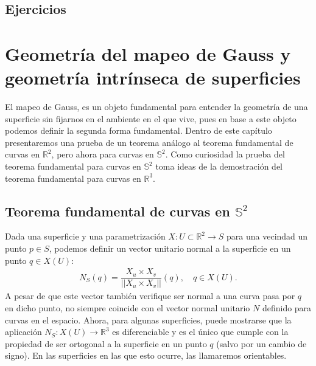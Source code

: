 \documentclass[oneside,11pt]{memoir}
\begin{document}
\section{Ejercicios}
\chapter{Geometría del mapeo de Gauss y geometría intrínseca de superficies}
El mapeo de Gauss, es un objeto fundamental para entender la geometría de una superficie sin fijarnos en el ambiente en el que vive, pues en base a este objeto podemos definir la segunda forma fundamental. Dentro de este capítulo presentaremos una prueba de un teorema análogo al teorema fundamental de curvas en $\mathbb{R}^2$, pero ahora para curvas en $\mathbb{S}^2$. Como curiosidad la prueba del teorema fundamental para curvas en $\mathbb{S}^2$ toma ideas de la demostración del teorema fundamental para curvas en $\mathbb{R}^3$.
\section{Teorema fundamental de curvas en $\mathbb{S}^2$}
Dada una superficie y una parametrización $X:U\subset\mathbb{R}^2\to S$ para una vecindad un punto $p\in S$, podemos definir un vector unitario normal a la superficie en un punto $q\in X(U)$:
\begin{align*}
    N_S(q)=\dfrac{X_u\times X_v}{||X_u\times X_v||}(q), \quad q\in X(U).
\end{align*}
A pesar de que este vector también verifique ser normal a una curva pasa por $q$ en dicho punto, no siempre coincide con el vector normal unitario $N$ definido para curvas en el espacio. Ahora, para algunas superficies, puede mostrarse que la aplicación $N_S:X(U)\to \mathbb{R}^3$ es diferenciable y es el único que cumple con la propiedad de ser ortogonal a la superficie en un punto $q$ (salvo por un cambio de signo). En las superficies en las que esto ocurre, las llamaremos orientables.
\end{document}
